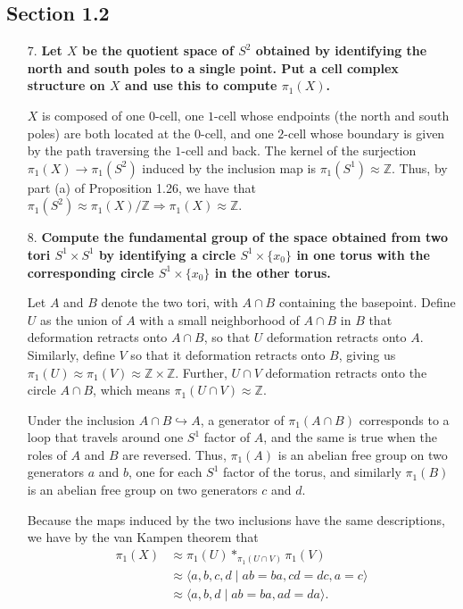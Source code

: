 \documentclass[a4paper,12pt]{article}
\newcommand{\iso}{\approx}
\begin{document}
\subsection*{Section 1.2}
\begin{enumerate}
    \item[7.]
        \boldmath\textbf{Let $X$ be the quotient space of $S^2$ obtained by identifying the north and south poles to a single point. Put a cell complex structure on $X$ and use this to compute $\pi_1(X)$.
        }\unboldmath \par
        $X$ is composed of one $0$-cell, one $1$-cell whose endpoints (the north and south poles) are both located at the $0$-cell, and one $2$-cell whose boundary is given by the path traversing the $1$-cell and back. %
        The kernel of the surjection $\pi_1(X) \to \pi_1(S^2)$ induced by the inclusion map is $\pi_1(S^1) \iso \mathbb{Z}$. Thus, by part (a) of Proposition 1.26, we have that $\pi_1(S^2) \iso \pi_1(X) / \mathbb{Z} \Rightarrow \pi_1(X) \iso \mathbb{Z}$.

    \item[8.]
        \boldmath\textbf{Compute the fundamental group of the space obtained from two tori $S^1 \times S^1$ by identifying a circle $S^1 \times \{x_0\}$ in one torus with the corresponding circle $S^1 \times \{x_0\}$ in the other torus.
        }\unboldmath \par
        Let $A$ and $B$ denote the two tori, with $A \cap B$ containing the basepoint. Define $U$ as the union of $A$ with a small neighborhood of $A \cap B$ in $B$ that deformation retracts onto $A \cap B$, so that $U$ deformation retracts onto $A$. Similarly, define $V$ so that it deformation retracts onto $B$, giving us $\pi_1(U) \iso \pi_1(V) \iso \mathbb{Z} \times \mathbb{Z}$. Further, $U \cap V$ deformation retracts onto the circle $A \cap B$, which means $\pi_1(U \cap V) \iso \mathbb{Z}$. \par
        Under the inclusion $A \cap B \hookrightarrow A$, a generator of $\pi_1(A \cap B)$ corresponds to a loop that travels around one $S^1$ factor of $A$, and the same is true when the roles of $A$ and $B$ are reversed. Thus, $\pi_1(A)$ is an abelian free group on two generators $a$ and $b$, one for each $S^1$ factor of the torus, and similarly $\pi_1(B)$ is an abelian free group on two generators $c$ and $d$. \par
        Because the maps induced by the two inclusions have the same descriptions, we have by the van Kampen theorem that
        \begin{align*}
            \pi_1(X) &\iso \pi_1(U) *_{\pi_1(U \cap V)} \pi_1(V) \\
            &\iso \langle a, b, c, d \mid ab = ba, cd = dc, a = c \rangle \\
            &\iso \langle a, b, d \mid ab = ba, ad = da \rangle.
        \end{align*}


\end{enumerate}
\end{document}
